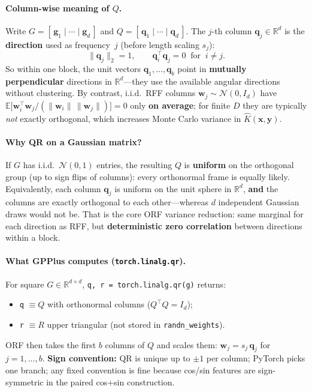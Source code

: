 \documentclass[11pt]{article}
\begin{document}
\paragraph{Column-wise meaning of $Q$.}
Write $G=[\,\mathbf g_1 \mid \cdots \mid \mathbf g_d\,]$ and $Q=[\,\mathbf q_1 \mid \cdots \mid \mathbf q_d\,]$.
The $j$-th column $\mathbf q_j\in\mathbb{R}^d$ is the \textbf{direction} used as frequency~$j$ (before length scaling $s_j$):
\begin{equation}
  \label{eq:orf-q-columns}
  \|\mathbf q_j\|_2 = 1,
  \qquad
  \mathbf q_i^{\top}\mathbf q_j = 0 \;\;\text{for}\;\; i\ne j.
\end{equation}
So within one block, the unit vectors $\mathbf q_1,\ldots,\mathbf q_b$ point in \textbf{mutually perpendicular}
directions in $\mathbb{R}^d$---they use the available angular directions without clustering.
By contrast, i.i.d.\ RFF columns $\mathbf w_j\sim\mathcal N(0,I_d)$ have
$\mathbb E\bigl[\mathbf w_i^{\top}\mathbf w_j / (\|\mathbf w_i\|\,\|\mathbf w_j\|)\bigr] = 0$ only \textbf{on average};
for finite $D$ they are typically \emph{not} exactly orthogonal, which increases Monte Carlo variance in
$\hat K(\mathbf x,\mathbf y)$.

\paragraph{Why QR on a Gaussian matrix?}
If $G$ has i.i.d.\ $\mathcal N(0,1)$ entries, the resulting $Q$ is \textbf{uniform} on the orthogonal group
(up to sign flips of columns): every orthonormal frame is equally likely.
Equivalently, each column $\mathbf q_j$ is uniform on the unit sphere in $\mathbb{R}^d$, \textbf{and} the columns
are exactly orthogonal to each other---whereas $d$ independent Gaussian draws would not be.
That is the core ORF variance reduction: same marginal for each direction as RFF, but \textbf{deterministic
zero correlation} between directions within a block.

\paragraph{What GPPlus computes (\texttt{torch.linalg.qr}).}
For square $G\in\mathbb{R}^{d\times d}$, \texttt{q, r = torch.linalg.qr(g)} returns:
\begin{itemize}
  \item \texttt{q} $\equiv Q$ with orthonormal columns ($Q^{\top}Q=I_d$);
  \item \texttt{r} $\equiv R$ upper triangular (not stored in \texttt{randn\_weights}).
\end{itemize}
ORF then takes the first $b$ columns of $Q$ and scales them:
$\mathbf w_j = s_j\,\mathbf q_j$ for $j=1,\ldots,b$.
\textbf{Sign convention:} QR is unique up to $\pm1$ per column; PyTorch picks one branch; any fixed convention
is fine because cos/sin features are sign-symmetric in the paired cos$+$sin construction.
\end{document}
